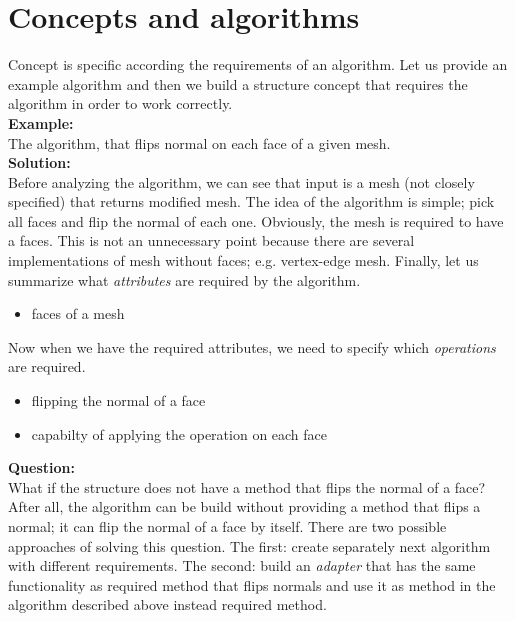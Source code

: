 \section{Concepts and algorithms}

Concept is specific according the requirements of an algorithm. Let us provide an example
algorithm and then we build a structure concept that requires the algorithm in order to work 
correctly.\\

\textbf{Example:}\\
The algorithm, that flips normal on each face of a given mesh.\\

\textbf{Solution:}\\
Before analyzing the algorithm, we can see that input is a mesh (not closely specified)
that returns modified mesh. The idea of the algorithm is simple; pick all faces
and flip the normal of each one. Obviously, the mesh is required to have a faces. This is not an
unnecessary point because there are several implementations of mesh without faces; e.g.
vertex-edge mesh. Finally, let us summarize what \emph{attributes} are required by the algorithm.

\begin{itemize}
\item faces of a mesh
\end{itemize}

Now when we have the required attributes, we need to specify which \emph{operations} are required.

\begin{itemize}
\item flipping the normal of a face 
\item capabilty of applying the operation on each face
\end{itemize}

\textbf{Question:}\\
What if the structure does not have a method that flips the normal of a face?\\

After all, the algorithm can be build without providing a method that flips a normal;
it can flip the normal of a face by itself.
There are two possible approaches of solving this question. The first: create separately
next algorithm with different requirements. The second: build an \emph{adapter} that
has the same functionality as required method that flips normals and use it as method
in the algorithm described above instead required method.\\

